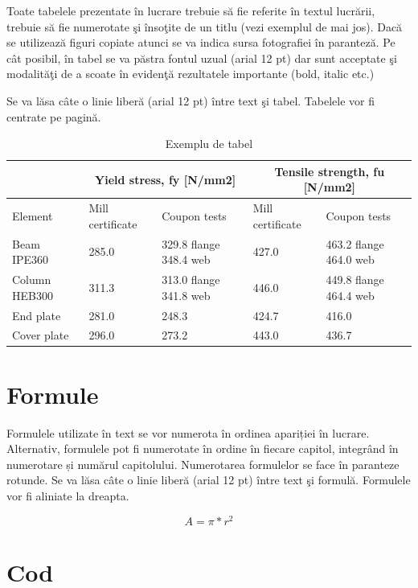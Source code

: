 Toate tabelele prezentate în lucrare trebuie să fie referite în textul lucrării, trebuie să fie numerotate şi însoţite de un titlu (vezi exemplul de mai jos). Dacă se utilizează figuri copiate atunci se va indica sursa fotografiei în paranteză. Pe cât posibil, în tabel se va păstra fontul uzual (arial 12 pt) dar sunt acceptate şi modalităţi de a scoate în evidenţă rezultatele importante (bold, italic etc.)

Se va lăsa câte o linie liberă (arial 12 pt) între text şi tabel. Tabelele vor fi centrate pe pagină.

\begin{table}[ht]
\centering
\caption{Exemplu de tabel}
\label{table:table1}
\begin{tabular}{ |p{2.9cm}|p{2.45cm}|p{4cm}|p{2.45cm}|p{4cm}|  }
 \hline
  &  \multicolumn{2}{|c|}{Yield stress, fy [N/mm2]} & \multicolumn{2}{|c|}{Tensile strength, fu [N/mm2]} \\
 \hline
 Element & Mill certificate & Coupon tests & Mill certificate & Coupon tests \\
 \hline
 Beam IPE360 & 285.0 & 329.8 flange 348.4 web & 427.0 & 463.2 flange 464.0 web \\
 \hline
 Column HEB300 & 311.3 & 313.0 flange 341.8 web	& 446.0	& 449.8 flange 464.4 web \\
 \hline
 End plate & 281.0 & 248.3 & 424.7 & 416.0 \\
 \hline
 Cover plate & 296.0 & 273.2 & 443.0 & 436.7 \\
 \hline
\end{tabular}
\end{table}

\section{Formule}

Formulele utilizate în text se vor numerota în ordinea apariției în lucrare. Alternativ, formulele pot fi numerotate în ordine în fiecare capitol, integrând în numerotare și numărul capitolului. Numerotarea formulelor se face în paranteze rotunde. Se va lăsa câte o linie liberă (arial 12 pt) între text şi formulă. Formulele vor fi aliniate la dreapta.

\begin{equation}
A=\pi*r^2
\end{equation}

\section{Cod}


